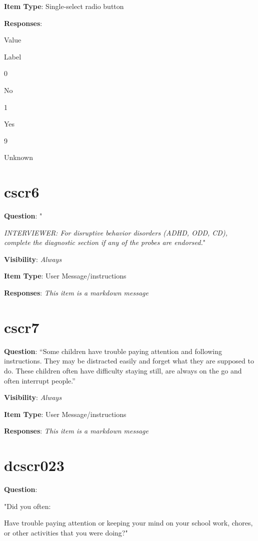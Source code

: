 \documentclass[]{book}
\begin{document}
\textbf{Item Type}: Single-select radio button

\textbf{Responses}:

Value

Label

0

No

1

Yes

9

Unknown

\hypertarget{cscr6}{%
\section{cscr6}\label{cscr6}}

\textbf{Question}: "

\emph{INTERVIEWER: For disruptive behavior disorders (ADHD, ODD, CD), complete the diagnostic section if any of the probes are endorsed.}"

\textbf{Visibility}: \emph{Always}

\textbf{Item Type}: User Message/instructions

\textbf{Responses}: \emph{This item is a markdown message}

\hypertarget{cscr7}{%
\section{cscr7}\label{cscr7}}

\textbf{Question}: ``Some children have trouble paying attention and following instructions. They may be distracted easily and forget what they are supposed to do. These children often have difficulty staying still, are always on the go and often interrupt people.''

\textbf{Visibility}: \emph{Always}

\textbf{Item Type}: User Message/instructions

\textbf{Responses}: \emph{This item is a markdown message}

\hypertarget{dcscr023}{%
\section{dcscr023}\label{dcscr023}}

\textbf{Question}:

"Did you often:

Have trouble paying attention or keeping your mind on your school work, chores, or other activities that you were doing?"
\end{document}
